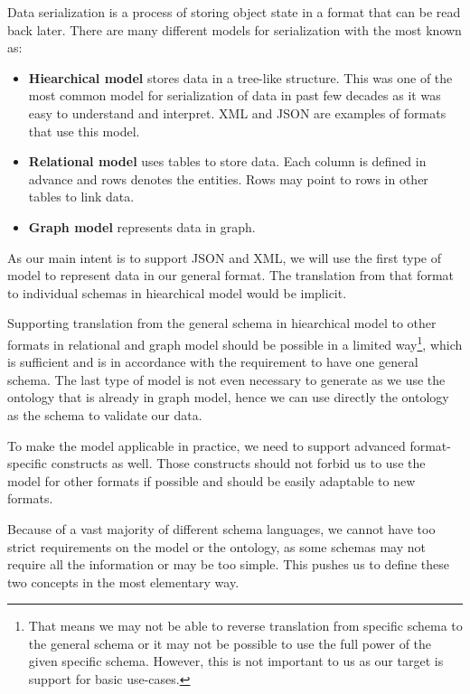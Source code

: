 Data serialization is a process of storing object state in a format that can be read back later. There are many different models for serialization with the most known as:
\begin{itemize}
    \item \textbf{Hiearchical model} stores data in a tree-like structure. This was one of the most common model for serialization of data in past few decades as it was easy to understand and interpret. XML and JSON are examples of formats that use this model.
    \item \textbf{Relational model} uses tables to store data. Each column is defined in advance and rows denotes the entities. Rows may point to rows in other tables to link data.
    \item \textbf{Graph model} represents data in graph.
\end{itemize}


As our main intent is to support JSON and XML, we will use the first type of model to represent data in our general format. The translation from that format to individual schemas in hiearchical model would be implicit.

Supporting translation from the general schema in hiearchical model to other formats in relational and graph model should be possible in a limited way\footnote{That means we may not be able to reverse translation from specific schema to the general schema or it may not be possible to use the full power of the given specific schema. However, this is not important to us as our target is support for basic use-cases.}, which is sufficient and is in accordance with the requirement to have one general schema. The last type of model is not even necessary to generate as we use the ontology that is already in graph model, hence we can use directly the ontology as the schema to validate our data.

To make the model applicable in practice, we need to support advanced format-specific constructs as well. Those constructs should not forbid us to use the model for other formats if possible and should be easily adaptable to new formats.

Because of a vast majority of different schema languages, we cannot have too strict requirements on the model or the ontology, as some schemas may not require all the information or may be too simple. This pushes us to define these two concepts in the most elementary way.

